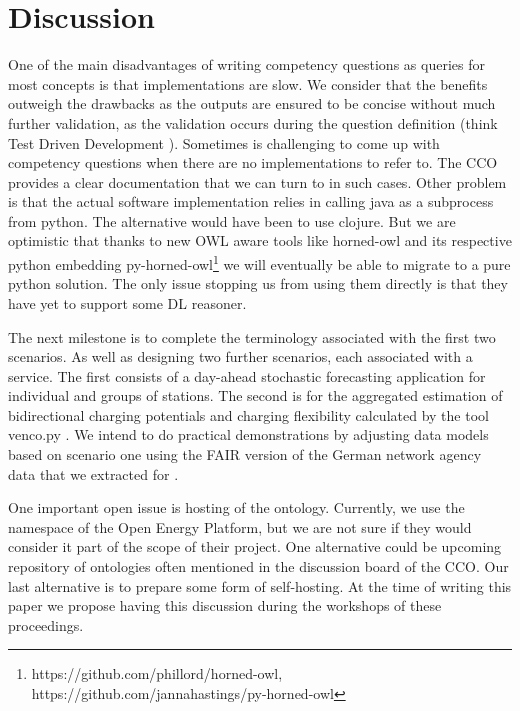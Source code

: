 \section{Discussion}
\label{discussion}

One of the main disadvantages of writing competency questions as queries for
most concepts is that implementations are slow. We consider that the benefits
outweigh the drawbacks as the outputs are ensured to be concise without much
further validation, as the validation occurs during the question definition
(think Test Driven Development \cite{ArellanoRuiz.2022}). Sometimes is
challenging to come up with competency questions when there are no
implementations to refer to. The CCO provides a clear documentation that we can
turn to in such cases. Other problem is that the actual software implementation
relies in calling java as a subprocess from python. The alternative would have
been to use clojure. But we are optimistic that thanks to new OWL aware
tools like horned-owl and its respective python embedding
py-horned-owl\footnote{https://github.com/phillord/horned-owl,
https://github.com/jannahastings/py-horned-owl} we will eventually be able to
migrate to a pure python solution. The only issue stopping us from using them
directly is that they have yet to support some DL reasoner.

The next milestone is to complete the terminology associated with the first two
scenarios. As well as designing two further scenarios, each associated with a
service. The first consists of a day-ahead stochastic forecasting application
for individual and groups of stations. The second is for the aggregated
estimation of bidirectional charging potentials and charging flexibility
calculated by the tool {venco.py} \cite{Miorelli.2024}.  
We intend to do practical demonstrations  by adjusting data models based on
scenario one using the FAIR version of the German network agency data that we
extracted for \cite{ArellanoRuiz.2024}.

One important open issue is hosting of the ontology. Currently, we use the
namespace of the Open Energy Platform, but we are not sure if they would
consider it part of the scope of their project. One alternative could be
upcoming repository of ontologies often mentioned in the discussion board of the
CCO. Our last alternative is to prepare some form of self-hosting. At the time
of writing this paper we propose having this discussion during the workshops of
these proceedings.
